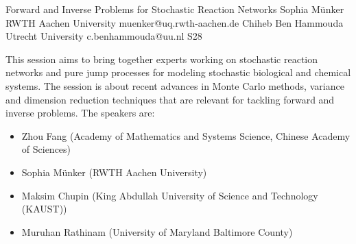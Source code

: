 \begin{session}
 {Forward and Inverse Problems for Stochastic Reaction Networks}%
 {Sophia Münker}%
 {RWTH Aachen University}%
 {muenker@uq.rwth-aachen.de}%
 {Chiheb Ben Hammouda}%
 {Utrecht University}%
 {c.benhammouda@uu.nl}%
 {S28}%
 {}%

 This session aims to bring together experts working on stochastic reaction networks and pure jump processes for modeling stochastic biological and chemical systems. The session is about recent advances in Monte Carlo methods, variance and dimension reduction techniques that are relevant for tackling forward and inverse problems.
 \medskip
 The speakers are:
 \begin{itemize}
 \item Zhou Fang (Academy of Mathematics and Systems Science, Chinese Academy of Sciences)
 \item Sophia Münker (RWTH Aachen University)
 \item Maksim Chupin (King Abdullah University of Science and Technology (KAUST))
 \item Muruhan Rathinam (University of Maryland Baltimore County)
 \end{itemize}
\end{session}



